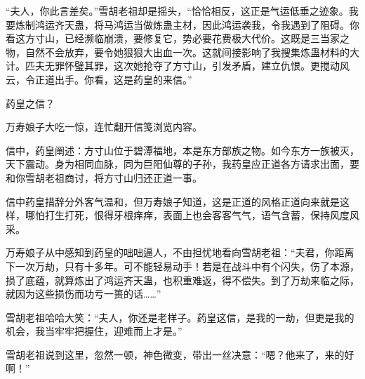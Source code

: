 \begin{this_body}
“夫人，你此言差矣。”雪胡老祖却是摇头，“恰恰相反，这正是气运低垂之迹象。我要炼制鸿运齐天蛊，将马鸿运当做炼蛊主材，因此鸿运袭我，令我遇到了阻碍。你看这方寸山，已经濒临崩溃，要修复它，势必要花费极大代价。这既是三当家之物，自然不会放弃，要令她狠狠大出血一次。这就间接影响了我搜集炼蛊材料的大计。匹夫无罪怀璧其罪，这次她抢夺了方寸山，引发矛盾，建立仇恨。更搅动风云，令正道出手。你看，这是药皇的来信。”

药皇之信？

万寿娘子大吃一惊，连忙翻开信笺浏览内容。

信中，药皇阐述：方寸山位于碧潭福地，本是东方部族之物。如今东方一族被灭，天下震动。身为相同血脉，同为巨阳仙尊的子孙，我药皇应正道各方请求出面，要和你雪胡老祖商讨，将方寸山归还正道一事。

信中药皇措辞分外客气温和，但万寿娘子知道，这是正道的风格正道向来就是这样，哪怕打生打死，恨得牙根痒痒，表面上也会客客气气，语气含蓄，保持风度风采。

万寿娘子从中感知到药皇的咄咄逼人，不由担忧地看向雪胡老祖：“夫君，你距离下一次万劫，只有十多年。可不能轻易动手！若是在战斗中有个闪失，伤了本源，损了底蕴，就算炼出了鸿运齐天蛊，也积重难返，得不偿失。到了万劫来临之际，就因为这些损伤而功亏一篑的话……”

雪胡老祖哈哈大笑：“夫人，你还是老样子。药皇这信，是我的一劫，但更是我的机会，我当牢牢把握住，迎难而上才是。”

雪胡老祖说到这里，忽然一顿，神色微变，带出一丝决意：“嗯？他来了，来的好啊！”

\end{this_body}

